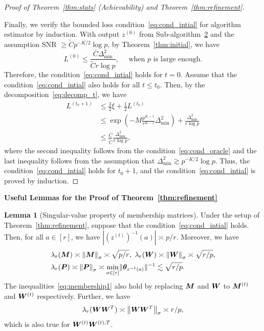 \documentclass[journal]{IEEEtran}
\theoremstyle{definition}
\newtheorem{lem}{Lemma}
\theoremstyle{definition}
\newcommand{\of}[1]{\left(#1\right)}
\begin{document}
\begin{proof}[Proof of Theorem~\ref{thm:stats} (Achievability) and Theorem~\ref{thm:refinement}]
{    }
    
    Finally, we verify the bounded loss condition~\eqref{eq:cond_intial} for algorithm estimator by induction.  With output $z^{(0)}$ from Sub-algorithm~\hyperref[alg:main]{2} and the assumption SNR $\geq \tilde C p^{-K/2} \log p$, by Theorem~\ref{thm:initial}, we have 
    \begin{equation}
        L^{(0)} \leq \frac{\bar C \Delta_{\min}^2}{\tilde C r \log p},\quad \text{    when $p$ is large enough}.
    \end{equation}
Therefore, the condition~\eqref{eq:cond_intial} holds for $t = 0$. Assume that the condition~\eqref{eq:cond_intial} also holds for all $t \leq t_0$. Then, by the decomposition~\eqref{eq:decomp_t}, we have 
    \begin{align}
         L^{(t_0+1)} &\leq \frac{3}{2} \xi + \frac{1}{2} L^{(t_0)} \\
         & \leq \exp \of{  - M \frac{p^{K-1}}{r^{K-1}}   \Delta_{\min}^2 } + \frac{\Delta_{\min}^2}{r \log p} \\
         & \leq \frac{\bar C}{\tilde C}\frac{\Delta_{\min}^2}{r\log p} ,
    \end{align}
    where the second inequality follows from the condition~\eqref{eq:cond_oracle} and the last inequality follows from the assumption that $\Delta_{\min}^2 \gtrsim p^{-K/2} \log p$. Thus, the condition~\eqref{eq:cond_intial} holds for $t_0 + 1$, and the condition~\eqref{eq:cond_intial} is proved by induction.
\end{proof}

{\bf Useful Lemmas for the Proof of Theorem~\ref{thm:refinement}} 



\begin{lem}[Singular-value property of membership matrices]\label{lem:membership} Under the setup of Theorem~\ref{thm:refinement}, suppose that the condition~\eqref{eq:cond_intial} holds. Then, for all $a \in [r]$, we have $|\of{z^{(t)}}^{-1}(a)| \asymp p/r$. Moreover, we have 
\begin{align}
     &\lambda_{r}(\mM) \asymp \onorm{\mM}_{\sigma} \asymp \sqrt{p/r}, \  \lambda_{r}(\mW) \asymp \onorm{\mW}_{\sigma} \asymp \sqrt{r/p},\\
     &\lambda_{r}(\mP) \asymp \onorm{\mP}_{\sigma}    \asymp  \min_{a \in [r] } \onormSize{}{\mtheta_{z^{-1}(a)}}^{-1}  \lesssim  \sqrt{r/p}. \label{eq:membership1}
\end{align}
The inequalities~\eqref{eq:membership1} also hold by replacing $\bm M$ and $\bm{W}$ to $\bm M^{(t)}$ and $\bm{W}^{(t)}$ respectively. 
Further, we have 
\begin{equation}\label{eq:WWsingular}
   \lambda_{r}(\mW\mW^T) \asymp \onorm{\mW\mW^T}_{\sigma} \asymp r/p,
\end{equation}
which is also true for $\bm{W}^{(t)}\bm{W}^{(t),T}$.
\end{lem}
\end{document}
